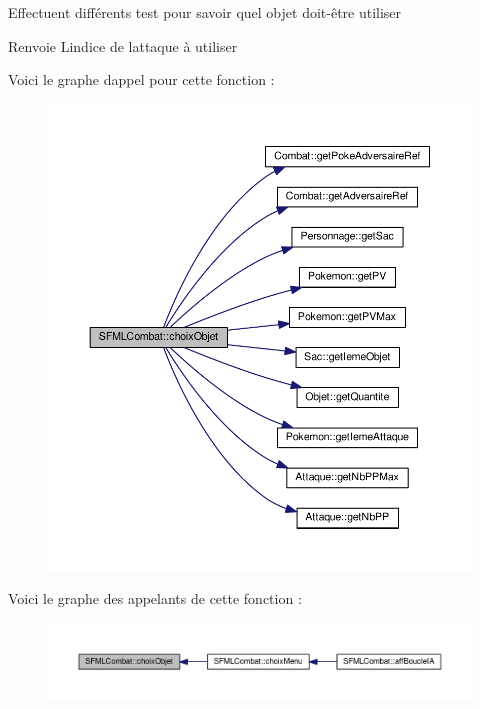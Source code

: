 Effectuent différents test pour savoir quel objet doit-\/être utiliser \begin{DoxyReturn}{Renvoie}
L\textquotesingle{}indice de l\textquotesingle{}attaque à utiliser 
\end{DoxyReturn}
Voici le graphe d\textquotesingle{}appel pour cette fonction \+:\nopagebreak
\begin{figure}[H]
\begin{center}
\leavevmode
\includegraphics[width=350pt]{class_s_f_m_l_combat_aa22c1c2665846e97e2eef331af8420d1_cgraph}
\end{center}
\end{figure}
Voici le graphe des appelants de cette fonction \+:\nopagebreak
\begin{figure}[H]
\begin{center}
\leavevmode
\includegraphics[width=350pt]{class_s_f_m_l_combat_aa22c1c2665846e97e2eef331af8420d1_icgraph}
\end{center}
\end{figure}
\mbox{\label{class_s_f_m_l_combat_a4d5b43087452661e39479026a886d1b6}} 
